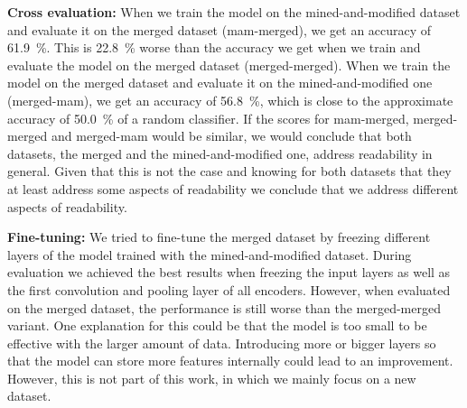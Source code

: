 \documentclass[%
class=scrreprt,
chapterprefix=false,%
open=right,%
twoside=false,%
paper=a4,%
logofile={Logo\_zentral\_farbig\_EN.png},%
thesistype=master,%
UKenglish,%
]{se2thesis}
\theoremstyle{definition}
\begin{document}
	\textbf{Cross evaluation:}
	When we train the model on the mined-and-modified dataset and evaluate it on the merged dataset (mam-merged), we get an accuracy of 61.9~\%. This is 22.8~\% worse than the accuracy we get when we train and evaluate the model on the merged dataset (merged-merged). When we train the model on the merged dataset and evaluate it on the mined-and-modified one (merged-mam), we get an accuracy of 56.8~\%, which is close to the approximate accuracy of 50.0~\% of a random classifier.
	If the scores for mam-merged, merged-merged and merged-mam would be similar, we would conclude that both datasets, the merged and the mined-and-modified one, address readability in general. Given that this is not the case and knowing for both datasets that they at least address some aspects of readability we conclude that we address different aspects of readability.
	
	
	
	\textbf{Fine-tuning:}
	We tried to fine-tune the merged dataset by freezing different layers of the model trained with the mined-and-modified dataset. During evaluation we achieved the best results when freezing the input layers as well as the first convolution and pooling layer of all encoders. 
	However, when evaluated on the merged dataset, the performance is still worse than the merged-merged variant.
	One explanation for this could be that the model is too small to be effective with the larger amount of data. Introducing more or bigger layers so that the model can store more features internally could lead to an improvement. However, this is not part of this work, in which we mainly focus on a new dataset.
	
\end{document}
